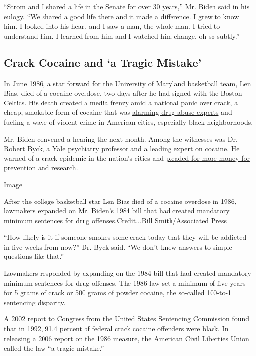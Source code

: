 ``Strom and I shared a life in the Senate for over 30 years,'' Mr. Biden
said in his eulogy. ``We shared a good life there and it made a
difference. I grew to know him. I looked into his heart and I saw a man,
the whole man. I tried to understand him. I learned from him and I
watched him change, oh so subtly.''

\hypertarget{crack-cocaine-and-a-tragic-mistake}{%
\subsection{Crack Cocaine and `a Tragic
Mistake'}\label{crack-cocaine-and-a-tragic-mistake}}

In June 1986, a star forward for the University of Maryland basketball
team, Len Bias, died of a cocaine overdose, two days after he had signed
with the Boston Celtics. His death created a media frenzy amid a
national panic over crack, a cheap, smokable form of cocaine that was
\href{https://www.nytimes3xbfgragh.onion/1985/11/29/nyregion/a-new-purified-form-of-cocaine-causes-alarm-as-abuse-increases.html}{alarming
drug-abuse experts} and fueling a wave of violent crime in American
cities, especially black neighborhoods.

Mr. Biden convened a hearing the next month. Among the witnesses was Dr.
Robert Byck, a Yale psychiatry professor and a leading expert on
cocaine. He warned of a crack epidemic in the nation's cities and
\href{https://www.c-span.org/video/?150176-1/crack-cocaine}{pleaded for
more money for prevention and research}.

Image

After the college basketball star Len Bias died of a cocaine overdose in
1986, lawmakers expanded on Mr. Biden's 1984 bill that had created
mandatory minimum sentences for drug offenses.Credit...Bill
Smith/Associated Press

``How likely is it if someone smokes some crack today that they will be
addicted in five weeks from now?'' Dr. Byck said. ``We don't know
answers to simple questions like that.''

Lawmakers responded by expanding on the 1984 bill that had created
mandatory minimum sentences for drug offenses. The 1986 law set a
minimum of five years for 5 grams of crack or 500 grams of powder
cocaine, the so-called 100-to-1 sentencing disparity.

A
\href{https://www.ussc.gov/research/congressional-reports/2002-report-congress-federal-cocaine-sentencing-policy}{2002
report to Congress from} the United States Sentencing Commission found
that in 1992, 91.4 percent of federal crack cocaine offenders were
black. In releasing a
\href{https://www.aclu.org/press-releases/aclu-releases-crack-cocaine-report-anti-drug-abuse-act-1986-deepened-racial-inequity}{2006
report on the 1986 measure, the American Civil Liberties Union} called
the law ``a tragic mistake.''

